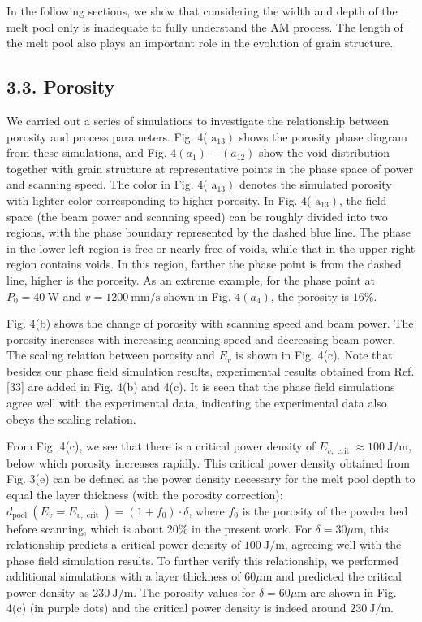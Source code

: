 \documentclass[10pt]{article}
\begin{document}
In the following sections, we show that considering the width and depth of the melt pool only is inadequate to fully understand the AM process. The length of the melt pool also plays an important role in the evolution of grain structure.

\subsection*{3.3. Porosity}
We carried out a series of simulations to investigate the relationship between porosity and process parameters. Fig. 4( $\left.\mathrm{a}_{13}\right)$ shows the porosity phase diagram from these simulations, and Fig. $4\left(a_{1}\right)-\left(a_{12}\right)$ show the void distribution together with grain structure at representative points in the phase space of power and scanning speed. The color in Fig. 4( $\left.\mathrm{a}_{13}\right)$ denotes the simulated porosity with lighter color corresponding to higher porosity. In Fig. 4( $\left.\mathrm{a}_{13}\right)$, the field space (the beam power and scanning speed) can be roughly divided into two regions, with the phase boundary represented by the dashed blue line. The phase in the lower-left region is free or nearly free of voids, while that in the upper-right region contains voids. In this region, farther the phase point is from the dashed line, higher is the porosity. As an extreme example, for the phase point at $P_{0}=40 \mathrm{~W}$ and $v=1200 \mathrm{~mm} / \mathrm{s}$ shown in Fig. $4\left(a_{4}\right)$, the porosity is $16 \%$.

Fig. 4(b) shows the change of porosity with scanning speed and beam power. The porosity increases with increasing scanning speed and decreasing beam power. The scaling relation between porosity and $E_{v}$ is shown in Fig. 4(c). Note that besides our phase field simulation results, experimental results obtained from Ref. [33] are added in Fig. 4(b) and 4(c). It is seen that the phase field simulations agree well with the experimental data, indicating the experimental data also obeys the scaling relation.

From Fig. 4(c), we see that there is a critical power density of $E_{v, \text { crit }} \approx 100 \mathrm{~J} / \mathrm{m}$, below which porosity increases rapidly. This critical power density obtained from Fig. 3(e) can be defined as the power density necessary for the melt pool depth to equal the layer thickness (with the porosity correction): $d_{\text {pool }}\left(E_{v}=E_{v, \text { crit }}\right)=\left(1+f_{0}\right) \cdot \delta$, where $f_{0}$ is the porosity of the powder bed before scanning, which is about $20 \%$ in the present work. For $\delta=30 \mu \mathrm{m}$, this relationship predicts a critical power density of $100 \mathrm{~J} / \mathrm{m}$, agreeing well with the phase field simulation results. To further verify this relationship, we performed additional simulations with a layer thickness of $60 \mu \mathrm{m}$ and predicted the critical power density as $230 \mathrm{~J} / \mathrm{m}$. The porosity values for $\delta=60 \mu \mathrm{m}$ are shown in Fig. 4(c) (in purple dots) and the critical power density is indeed around $230 \mathrm{~J} / \mathrm{m}$.
\end{document}
